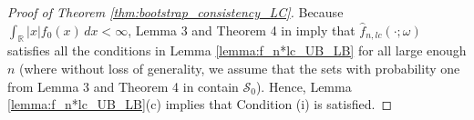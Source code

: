 \documentclass[12pt,letterpaper, twoside, openany]{article}
\theoremstyle{plain}
\begin{document}
\begin{proof}[Proof of Theorem \ref{thm:bootstrap_consistency_LC}]
Because $\int_\mathbb{R} |x| f_0(x)\, dx < \infty$, Lemma 3  and Theorem 4 in \cite{cule2010MLE_log_concave} imply that $\hat{f}_{n,lc}(\cdot; \omega)$ satisfies all the conditions in Lemma \ref{lemma:f_n*lc_UB_LB} for all large enough $n$ (where without loss of generality, we assume that the sets with probability one from Lemma 3 and Theorem 4 in \cite{cule2010MLE_log_concave} contain $\mathcal{S}_0$). Hence, Lemma \ref{lemma:f_n*lc_UB_LB}(c) implies that Condition (i) is satisfied.


\end{proof}
\end{document}
